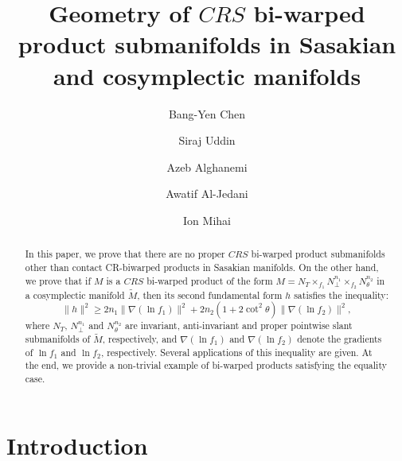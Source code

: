 \documentclass[reqno]{amsart}
\theoremstyle{plain}
\theoremstyle{remark}
\numberwithin{equation}{section}
\begin{document}
%
\title[Geometry of $CRS$ bi-warped product submanifolds]{Geometry of $CRS$ bi-warped product submanifolds in Sasakian and cosymplectic manifolds}
%
\author[B.-Y. Chen]{Bang-Yen Chen}
\address{Department of Mathematics, Michigan State University, East Lansing, Michigan,
48824--1027, U.S.A.}
%
\author[S. Uddin]{Siraj Uddin}
\address{Department of Mathematics, Faculty of Science, King Abdulaziz University,Jeddah 21589, Saudi Arabia}

\author[A. Alghanemi]{Azeb Alghanemi}
\address{Department of Mathematics, Faculty of Science, King Abdulaziz University, Jeddah 21589, Saudi Arabia}

\author[A. Al-Jedani]{Awatif Al-Jedani}
\address{Department of Mathematics, Faculty of Science, University of Jeddah, 23890 Jeddah, Saudi Arabia}
%
\author[I. Mihai]{Ion Mihai}
\address{Faculty of Mathematics and Computer Science, University of Bucharest, Str. Academiei 14, 010014 Bucharest, Romania}

%
\begin{abstract} In this paper, we prove that there are no proper $CRS$ bi-warped product submanifolds other than contact CR-biwarped products in Sasakian manifolds. On the other hand, we prove that if $M$ is a $CRS$ bi-warped product of the form $M=N_T \times_{f_1}N^{n_{1}}_\perp\times_{f_2} N^{n_{2}}_\theta$ in a cosymplectic manifold $\widetilde M$, then its second fundamental form $h$ satisfies the inequality: $$\|h\|^2\geq 2n_1\|\nabla(\ln f_1)\|^2+2n_2(1+2\cot^2\theta)\|\nabla(\ln f_2)\|^2,$$ where $N_T,\, N^{n_{1}}_\perp$ and $N^{n_{2}}_\theta$ are invariant, anti-invariant and proper pointwise slant submanifolds of $\widetilde M$, respectively,  and $\nabla(\ln f_1)$ and $\nabla(\ln f_2)$ denote the gradients of $\ln f_{1}$ and $\ln f_{2}$, respectively. Several applications of this inequality are given. At the end, we provide a non-trivial example of bi-warped products satisfying the equality case.
\end{abstract}
%
%
%
%
%
\maketitle

\section{Introduction}
\end{document}
